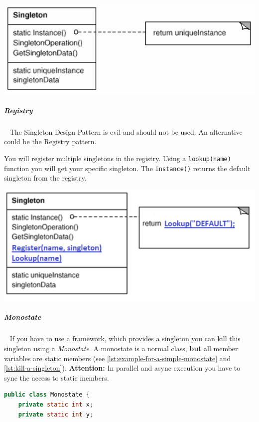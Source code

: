 \documentclass[11pt,twoside,landscape]{article}
\begin{document}
\begin{multicols}{3}
{
\begin{center}
\includegraphics[width=.9\linewidth]{img/singleton.png}
\end{center}
\label{fig:singelton-class-diagram}
}
\subparagraph{Registry} \
\label{sec:orgeafc9db}
The Singleton Design Pattern is evil and should not be used.
An alternative could be the Registry pattern.

You will register multiple singletons in the registry.
Using a \texttt{lookup(name)} function you will get your specific singleton.
The \texttt{instance()} returns the default singleton from the registry.


{
\begin{center}
\includegraphics[width=.9\linewidth]{img/registry.png}
\end{center}
\label{fig:registry uml}
}
\subparagraph{Monostate} \
\label{sec:org6e3a0a4}
If you have to use a framework, which provides a singleton you can kill this singleton using a \emph{Monostate}.
A monostate is a normal class, \textbf{but} all member variables are static members (see \autoref{lst:example-for-a-simple-monostate} and \autoref{lst:kill-a-singleton}).
\textbf{Attention:} In parallel and async execution you have to sync the access to static members.


\begin{lstlisting}[language=java,label=lst:example-for-a-simple-monostate,caption={Example for a simple monostate},captionpos=b,numbers=none]
public class Monostate {
    private static int x;
    private static int y;


\end{lstlisting}
\end{multicols}
\end{document}
